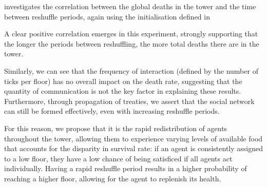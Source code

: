  investigates the correlation between the global deaths in the tower and the time between reshuffle periods, again using the initialisation defined in  

A clear positive correlation emerges in this experiment, strongly supporting that the longer the periods between reshuffling, the more total deaths there are in the tower.

Similarly, we can see that the frequency of interaction (defined by the number of ticks per floor) has no overall impact on the death rate, suggesting that the quantity of communication is not the key factor in explaining these results. Furthermore, through propagation of treaties, we assert that the social network can still be formed effectively, even with increasing reshuffle periods.

For this reason, we propose that it is the rapid redistribution of agents throughout the tower, allowing them to experience varying levels of available food that accounts for the disparity in survival rate: if an agent is consistently assigned to a low floor, they have a low chance of being satisficed if all agents act individually. Having a rapid reshuffle period results in a higher probability of reaching a higher floor, allowing for the agent to replenish its health. 

